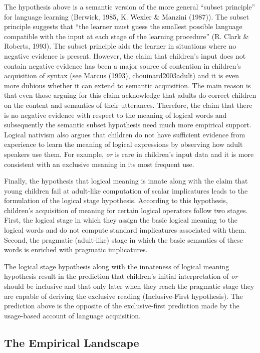 \documentclass[oneside]{report}
\theoremstyle{definition}
\theoremstyle{definition}
\theoremstyle{definition}
\theoremstyle{remark}
\begin{document}
The hypothesis above is a semantic version of the more general ``subset
principle'' for language learning (Berwick, 1985, K. Wexler \& Manzini
(1987)). The subset principle suggests that ``the learner must guess the
smallest possible language compatible with the input at each stage of
the learning procedure'' (R. Clark \& Roberts, 1993). The subset
principle aids the learner in situations where no negative evidence is
present. However, the claim that children's input does not contain
negative evidence has been a major source of contention in children's
acquisition of syntax (see Marcus (1993), chouinard2003adult) and it is
even more dubious whether it can extend to semantic acquisition. The
main reason is that even those arguing for this claim acknowledge that
adults do correct children on the content and semantics of their
utterances. Therefore, the claim that there is no negative evidence with
respect to the meaning of logical words and subsequently the semantic
subset hypothesis need much more empirical support. Logical nativism
also argues that children do not have sufficient evidence from
experience to learn the meaning of logical expressions by observing how
adult speakers use them. For example, \emph{or} is rare in children's
input data and it is more consistent with an exclusive meaning in its
most frequent use.

Finally, the hypothesis that logical meaning is innate along with the
claim that young children fail at adult-like computation of scalar
implicatures leads to the formulation of the logical stage hypothesis.
According to this hypothesis, children's acquisition of meaning for
certain logical operators follow two stages. First, the logical stage in
which they assign the basic logical meaning to the logical words and do
not compute standard implicatures associated with them. Second, the
pragmatic (adult-like) stage in which the basic semantics of these words
is enriched with pragmatic implicatures.

The logical stage hypothesis along with the innateness of logical
meaning hypothesis result in the prediction that children's initial
interpretation of \emph{or} should be inclusive and that only later when
they reach the pragmatic stage they are capable of deriving the
exclusive reading (Inclusive-First hypothesis). The prediction above is
the opposite of the exclusive-first prediction made by the usage-based
account of language acquisition.

\subsection{The Empirical Landscape}\label{the-empirical-landscape}
\end{document}
